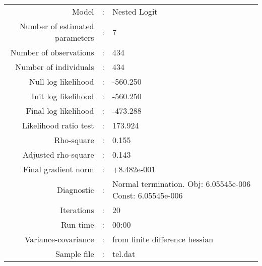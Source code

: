

\begin{flushleft}
\begin{tabular}{rcl}
\hline
Model &:& Nested Logit\\
Number of estimated parameters&:&7\\
Number of  observations &:& 434\\
Number of individuals&:&434\\
Null log likelihood&:&-560.250\\
Init log likelihood&:&-560.250\\
Final log likelihood&:&-473.288\\
Likelihood ratio test &:&173.924\\
Rho-square&:&0.155\\
Adjusted rho-square&:&0.143\\
Final gradient norm&:&+8.482e-001\\
Diagnostic&:&Normal termination. Obj: 6.05545e-006 Const: 6.05545e-006\\
Iterations&:&20\\
Run time&:&00:00\\
Variance-covariance&:&from finite difference hessian\\
Sample file&:&tel.dat\\
\end{tabular}
\end{flushleft}
